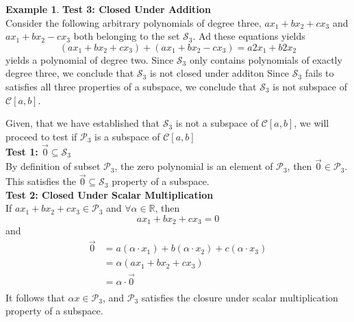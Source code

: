 \documentclass{book}
\theoremstyle{definition}
\newtheorem{example}{Example}[definition]
\theoremstyle{remark}
\newcommand{\bb}[1]{\mathbb{#1}}
\newcommand{\cc}[1]{\mathcal{#1}}
\newcommand{\m}{\cdot}
\begin{document}
\begin{example}
            
        \textbf{Test 3: Closed Under Addition} \\
            Consider the following arbitrary polynomials of degree three, $ax_1 + bx_2 + cx_3$ and $ax_1 + bx_2 - cx_3$ both belonging to the set $\cc{S}_3$. Ad these equations yields 
                \begin{equation*}
                    (ax_1 + bx_2 + cx_3) + (ax_1 + bx_2 - cx_3) = a2x_1 + b2x_2
                \end{equation*}
            yields a polynomial of degree two. Since $\cc{S}_3$ only contains polynomials of exactly degree three, we conclude that $\cc{S}_3$ is not closed under additon
        Since $\cc{S}_3$ fails to satisfies all three properties of a subspace, we conclude that $\cc{S}_3$ is not subspace of $\cc{C}[a,b]$. 
    
    Given, that we have established that $\cc{S}_3$ is not a subspace of $\cc{C}[a,b]$, we will proceed to test if $\cc{P}_3$ is a subspace of $\cc{C}[a,b]$ \\
        
        \textbf{Test 1: $\vec{0} \subseteq \cc{S}_3$} \\
            By definition of subset $\cc{P}_3$, the zero polynomial is an element of $\cc{P}_3$, then $ \vec{0} \in \cc{P}_3$. This satisfies the $\vec{0} \subseteq \cc{S}_3$ property of a subspace. \\
        
        \textbf{Test 2: Closed Under Scalar Multiplication} \\
            If $ax_1 + bx_2 + cx_3 \in \cc{P}_3$ and $\forall \alpha \in \bb{R}$, then 
                \begin{equation*}
                    ax_1 + bx_2 + cx_3 = 0
                \end{equation*}
            and 
                \begin{align*}
                    \vec{0} & = a(\alpha \m x_1) + b(\alpha \m x_2) + c(\alpha \m x_3) \\
                        & = \alpha(ax_1 + bx_2 + cx_3) \\
                        & = \alpha \m \vec{0} \\
                \end{align*}
            It follows that $\alpha x \in \cc{P}_3$, and $\cc{P}_3$ satisfies the closure under scalar multiplication property of a subspace. \\
        

\end{example}
\end{document}
